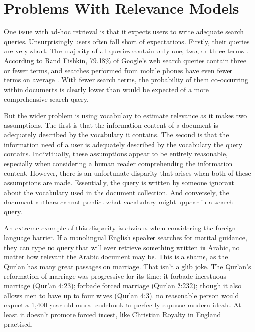 \section{Problems With Relevance Models}
One issue with ad-hoc retrieval is that it expects users to write adequate search queries. Unsurprisingly users often fall short of expectations. Firstly, their queries are very short. The majority of all queries contain only one, two, or three terms \cite{gabrilovich2009classifying}. According to Rand Fishkin, 79.18\% of Google's web search queries contain three or fewer terms, and searches performed from mobile phones have even fewer terms on average \cite{enge2012art}. With fewer search terms, the probability of them co-occurring within documents is clearly lower than would be expected of a more comprehensive search query.

But the wider problem is using vocabulary to estimate relevance as it makes two assumptions. The first is that the information content of a document is adequately described by the vocabulary it contains. The second is that the information need of a user is adequately described by the vocabulary the query contains. Individually, these assumptions appear to be entirely reasonable, especially when considering a human reader comprehending the information content. However, there is an unfortunate disparity that arises when both of these assumptions are made. Essentially, the query is written by someone ignorant about the vocabulary used in the document collection. And conversely, the document authors cannot predict what vocabulary might appear in a search query.

An extreme example of this disparity is obvious when considering the foreign language barrier. If a monolingual English speaker searches for marital guidance, they can type no query that will ever retrieve something written in Arabic, no matter how relevant the Arabic document may be. This is a shame, as the Qur'an has many great passages on marriage. That isn't a glib joke. The Qur'an's reformation of marriage was progressive for its time: it forbade incestuous marriage (Qur'an 4:23); forbade forced marriage (Qur'an 2:232); though it also allows men to have up to four wives (Qur'an 4:3), no reasonable person would expect a 1,400-year-old moral codebook to perfectly espouse modern ideals. At least it doesn't promote forced incest, like Christian Royalty in England practised.


